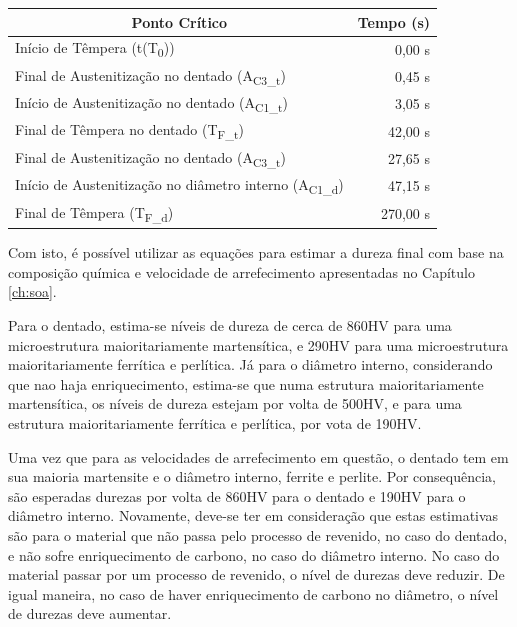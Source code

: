 \begin{table}[htb]
    \centering
    \label{tab:pontos_sim}
    \begin{tabular}{lr} 
    \toprule
    \multicolumn{1}{c}{\textbf{Ponto Crítico}}            & \multicolumn{1}{c}{\textbf{Tempo (s)}}                         \\ 
    \hline\hline
    Início de Têmpera (t(T\textsubscript{0}))                             & 0,00 s                                         \\ 
    \hline
    Final de Austenitização no dentado (A\textsubscript{C3\_t})           & 0,45 s                                         \\
    Início de Austenitização no dentado (A\textsubscript{C1\_t})          & 3,05 s                                         \\
    Final de Têmpera no dentado (T\textsubscript{F\_t})                   & 42,00 s                                        \\ 
    \hline\hline
    Final de Austenitização no dentado (A\textsubscript{C3\_t})           & 27,65 s                                        \\
    Início de Austenitização no diâmetro interno (A\textsubscript{C1\_d}) & 47,15 s                                        \\ 
    Final de Têmpera (T\textsubscript{F\_d})                              & 270,00 s                                       \\
    \bottomrule
    \end{tabular}
\end{table}
\newpage
\par
Com isto, é possível utilizar as equações para estimar a dureza final com base na composição química e velocidade de arrefecimento apresentadas no Capítulo \ref{ch:soa}.
\par
Para o dentado, estima-se níveis de dureza de cerca de 860HV para uma microestrutura maioritariamente martensítica, e 290HV para uma microestrutura maioritariamente ferrítica e perlítica. Já para o diâmetro interno, considerando que nao haja enriquecimento, estima-se que numa estrutura maioritariamente martensítica, os níveis de dureza estejam por volta de 500HV, e para uma estrutura maioritariamente ferrítica e perlítica, por vota de 190HV.
\par
Uma vez que para as velocidades de arrefecimento em questão, o dentado tem em sua maioria martensite e o diâmetro interno, ferrite e perlite. Por consequência, são esperadas durezas por volta de 860HV para o dentado e 190HV para o diâmetro interno. Novamente, deve-se ter em consideração que estas estimativas são para o material que não passa pelo processo de revenido, no caso do dentado, e não sofre enriquecimento de carbono, no caso do diâmetro interno. No caso do material passar por um processo de revenido, o nível de durezas deve reduzir. De igual maneira, no caso de haver enriquecimento de carbono no diâmetro, o nível de durezas deve aumentar.